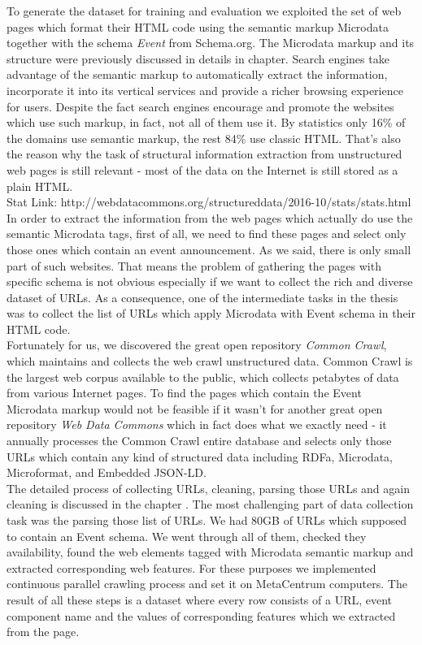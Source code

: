 To generate the dataset for training and evaluation we exploited the set of web pages which format their HTML code using the semantic markup Microdata together with the schema \textit{Event} from Schema.org. The Microdata markup and its structure were previously discussed in details in  chapter. Search engines take advantage of the semantic markup to automatically extract the information, incorporate it into its vertical services and provide a richer browsing experience for users. Despite the fact search engines encourage and promote the websites which use such markup, in fact, not all of them use it. By statistics only 16\% of the domains use semantic markup, the rest 84\% use classic HTML. That's also the reason why the task of structural information extraction from unstructured web pages is still relevant - most of the data on the Internet is still stored as a plain HTML.\\ 

Stat Link: http://webdatacommons.org/structureddata/2016-10/stats/stats.html  \\

In order to extract the information from the web pages which actually do use the semantic Microdata tags, first of all, we need to find these pages and select only those ones which contain an event announcement. As we said, there is only small part of such websites. That means the problem of gathering the pages with specific schema is not obvious especially if we want to collect the rich and diverse dataset of URLs. As a consequence, one of the intermediate tasks in the thesis was to collect the list of URLs which apply Microdata with Event schema in their HTML code. \\

Fortunately for us, we discovered the great open repository \textit{Common Crawl}, which maintains and collects the web crawl unstructured data. Common Crawl is the largest web corpus available to the public, which collects petabytes of data from various Internet pages. To find the pages which contain the Event Microdata markup would not be feasible if it wasn't for another great open repository \textit{Web Data Commons} which in fact does what we exactly need - it annually processes the Common Crawl entire database and selects only those URLs which contain any kind of structured data including RDFa, Microdata, Microformat, and Embedded JSON-LD. \\

The detailed process of collecting URLs, cleaning, parsing those URLs and again cleaning is discussed in the chapter . The most challenging part of data collection task was the parsing those list of URLs. We had 80GB of URLs which supposed to contain an Event schema. We went through all of them, checked they availability, found the web elements tagged with Microdata semantic markup and extracted corresponding web features. For these purposes we implemented continuous parallel crawling process and set it on MetaCentrum computers. The result of all these steps is a dataset where every row consists of a URL, event component name and the values of corresponding features which we extracted from the page.\\ 

